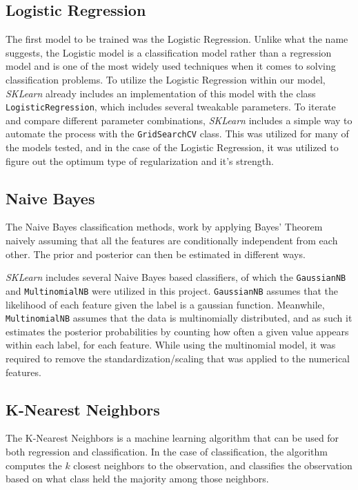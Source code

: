 \documentclass{IEEEtran}
\begin{document}
\subsection{Logistic Regression}
The first model to be trained was the Logistic Regression. Unlike what the name suggests, the Logistic model is a classification model rather than a regression model and is one of the most widely used techniques when it comes to solving classification problems. %
To utilize the Logistic Regression within our model, \textit{SKLearn} already includes an implementation of this model with the class \texttt{LogisticRegression}, which includes several tweakable parameters. To iterate and compare different parameter combinations, \textit{SKLearn} includes a simple way to automate the process with the \texttt{GridSearchCV} class. This was utilized for many of the models tested, and in the case of the Logistic Regression, it was utilized to figure out the optimum type of regularization and it's strength.

\subsection{Naive Bayes}

The Naive Bayes classification methods, work by applying Bayes' Theorem naively assuming that all the features are conditionally independent from each other. The prior and posterior can then be estimated in different ways.

\textit{SKLearn} includes several Naive Bayes based classifiers, of which the \texttt{GaussianNB} and \texttt{MultinomialNB} were utilized in this project. \texttt{GaussianNB} assumes that the likelihood of each feature given the label is a gaussian function. Meanwhile, \texttt{MultinomialNB} assumes that the data is multinomially distributed, and as such it estimates the posterior probabilities by counting how often a given value appears within each label, for each feature. While using the multinomial model, it was required to remove the standardization/scaling that was applied to the numerical features.

\subsection{K-Nearest Neighbors}

The K-Nearest Neighbors is a machine learning algorithm that can be used for both regression and classification. In the case of classification, the algorithm computes the $k$ closest neighbors to the observation, and classifies the observation based on what class held the majority among those neighbors.
\end{document}
